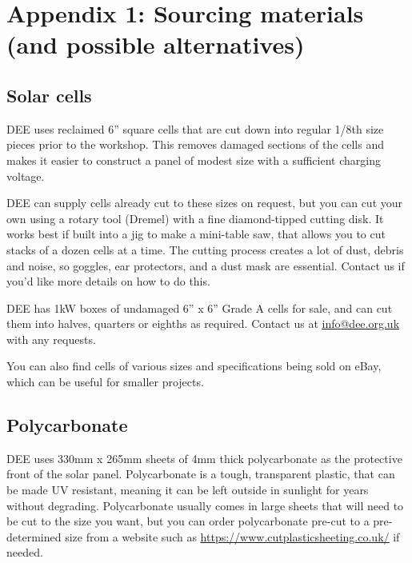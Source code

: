 \documentclass{article}
\theoremstyle{definition}
\theoremstyle{definition}
\theoremstyle{remark}
\begin{document}


\newpage

{\color{blue}\section{Appendix 1: Sourcing materials (and possible alternatives)}} %
\label{sec:appendix_1_sourcing_materials_and_possible_alternatives_}

  \subsection*{Solar cells} %
  \label{sub:solar_cells}

    DEE uses reclaimed 6” square cells that are cut down into regular 1/8th size pieces prior to the workshop. This removes damaged sections of the cells and makes it easier to construct a panel of modest size with a sufficient charging voltage. 

    DEE can supply cells already cut to these sizes on request, but you can cut your own using a rotary tool (Dremel) with a fine diamond-tipped cutting disk. It works best if built into a jig to make a mini-table saw, that allows you to cut stacks of a dozen cells at a time. The cutting process creates a lot of dust, debris and noise, so goggles, ear protectors, and a dust mask are essential. Contact us if you'd like more details on how to do this.

    DEE has 1kW boxes of undamaged 6” x 6” Grade A cells for sale, and can cut them into halves, quarters or eighths as required. Contact us at \href{mailto:info@dee.org.uk}{\underline{info@dee.org.uk}} with any requests.

    You can also find cells of various sizes and specifications being sold on eBay, which can be useful for smaller projects.
  

  \subsection*{Polycarbonate} %
  \label{sub:polycarbonate}

    DEE uses 330mm x 265mm sheets of 4mm thick polycarbonate as the protective front of the solar panel. Polycarbonate is a tough, transparent plastic, that can be made UV resistant, meaning it can be left outside in sunlight for years without degrading. Polycarbonate usually comes in large sheets that will need to be cut to the size you want, but you can order polycarbonate pre-cut to a pre-determined size from a website such as \href{https://www.cutplasticsheeting.co.uk/clear-acrylic-sheeting/clear-polycarbonate-sheet}{\underline{https://www.cutplasticsheeting.co.uk/}} if needed.
\end{document}
